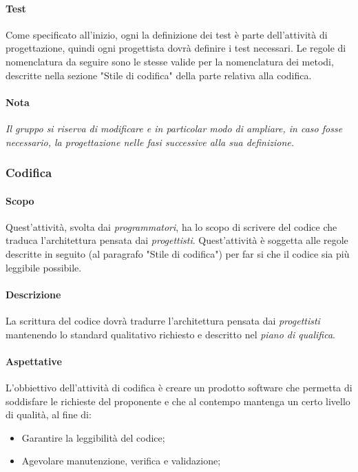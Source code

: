 \documentclass[../norme_di_progetto.tex]{subfiles}
\begin{document}
 
 \paragraph{Test}
  Come specificato all'inizio, ogni la definizione dei test è parte dell'attività di progettazione, quindi ogni progettista dovrà definire i test necessari. Le regole di nomenclatura da seguire sono le stesse valide per la nomenclatura dei metodi, descritte nella sezione "Stile di codifica" della parte relativa alla codifica.
  
  \paragraph{Nota}
  \emph{Il gruppo si riserva di modificare e in particolar modo di ampliare, in caso fosse necessario, la progettazione nelle fasi successive alla sua definizione.}
  
  \subsubsection{Codifica}
 
 \paragraph{Scopo}
    Quest'attività, svolta dai \emph{programmatori}, ha lo scopo di scrivere del codice che traduca l'architettura pensata dai \emph{progettisti}. Quest'attività è soggetta alle regole descritte in seguito (al paragrafo "Stile di codifica") per far si che il codice sia più leggibile possibile.
 
 \paragraph{Descrizione}
 La scrittura del codice dovrà tradurre l'architettura pensata dai \emph{progettisti} mantenendo lo standard qualitativo richiesto e descritto nel \emph{piano di qualifica}.
 
 \paragraph{Aspettative}
 L'obbiettivo dell'attività di codifica è creare un prodotto software che permetta di soddisfare le richieste del proponente e che al contempo mantenga un certo livello di qualità, al fine di:
 \begin{itemize}
     \item Garantire la leggibilità del codice;
     \item Agevolare manutenzione, verifica e validazione;
 \end{itemize}
 
\end{document}

